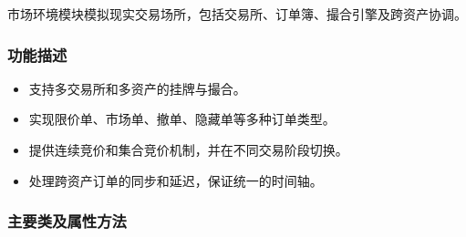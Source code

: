 市场环境模块模拟现实交易场所，包括交易所、订单簿、撮合引擎及跨资产协调。

\subsubsection{功能描述}
\begin{itemize}
  \item 支持多交易所和多资产的挂牌与撮合。
  \item 实现限价单、市场单、撤单、隐藏单等多种订单类型。
  \item 提供连续竞价和集合竞价机制，并在不同交易阶段切换。
  \item 处理跨资产订单的同步和延迟，保证统一的时间轴。
\end{itemize}

\subsubsection{主要类及属性方法}
